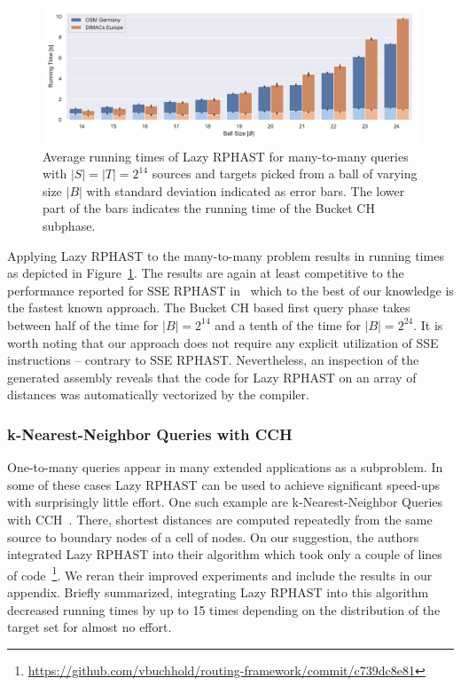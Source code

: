 \documentclass[manuscript,review]{acmart}
\begin{document}
\begin{figure}
\centering
\includegraphics[width=\linewidth]{fig/lazy_rphast_many_to_many.pdf}
\caption{
Average running times of Lazy RPHAST for many-to-many queries with $|S| = |T| = 2^{14}$ sources and targets picked from a ball of varying size $|B|$ with standard deviation indicated as error bars.
The lower part of the bars indicates the running time of the Bucket CH subphase.
}\label{fig:many_to_many}
\end{figure}

Applying Lazy RPHAST to the many-to-many problem results in running times as depicted in Figure~\ref{fig:many_to_many}.
The results are again at least competitive to the performance reported for SSE RPHAST in~\cite{delling_et_al:OASIcs:2011:3266} which to the best of our knowledge is the fastest known approach.
The Bucket CH based first query phase takes between half of the time for $|B| = 2^{14}$ and a tenth of the time for $|B| = 2^{24}$.
It is worth noting that our approach does not require any explicit utilization of SSE instructions -- contrary to SSE RPHAST.
Nevertheless, an inspection of the generated assembly reveals that the code for Lazy RPHAST on an array of distances was automatically vectorized by the compiler.

\subsubsection{k-Nearest-Neighbor Queries with CCH}

One-to-many queries appear in many extended applications as a subproblem.
In some of these cases Lazy RPHAST can be used to achieve significant speed-ups with surprisingly little effort.
One such example are k-Nearest-Neighbor Queries with CCH~\cite{buchhold_et_al:LIPIcs.SEA.2021.18}.
There, shortest distances are computed repeatedly from the same source to boundary nodes of a cell of nodes.
On our suggestion, the authors integrated Lazy RPHAST into their algorithm which took only a couple of lines of code~\footnote{\url{https://github.com/vbuchhold/routing-framework/commit/c739dc8e81}}.
We reran their improved experiments and include the results in our appendix.
Briefly summarized, integrating Lazy RPHAST into this algorithm decreased running times by up to 15 times depending on the distribution of the target set for almost no effort.
\end{document}

